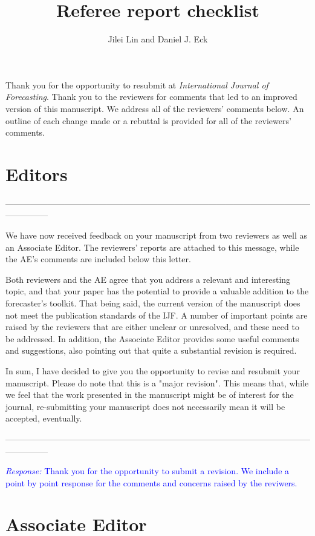 \documentclass[12pt]{article}
\title{Referee report checklist}
\author{Jilei Lin and Daniel J. Eck}
\date{}
\newcommand{\response}[1]{\noindent \textcolor{blue}{\emph{Response:} #1}}
\begin{document}
\maketitle

Thank you for the opportunity to resubmit at \emph{International Journal of Forecasting}. Thank you to the reviewers for comments that led to an improved version of this manuscript. We address all of the reviewers' comments below. An outline of each change made or a rebuttal is provided for all of the reviewers' comments.

\section*{Editors}

---------------------------------------------------------------------------------------------------------------------------


We have now received feedback on your manuscript from two reviewers as well as an Associate Editor. The reviewers' reports are attached to this message, while the AE's comments are included below this letter.

Both reviewers and the AE agree that you address a relevant and interesting topic, and that your paper has the potential to provide a valuable addition to the forecaster's toolkit. That being said, the current version of the manuscript does not meet the publication standards of the IJF. A number of important points are raised by the reviewers that are either unclear or unresolved, and these need to be addressed. In addition, the Associate Editor provides some useful comments and suggestions, also pointing out that quite a substantial revision is required.

In sum, I have decided to give you the opportunity to revise and resubmit your manuscript. Please do note that this is a "major revision". This means that, while we feel that the work presented in the manuscript might be of interest for the journal, re-submitting your manuscript does not necessarily mean it will be accepted, eventually.

---------------------------------------------------------------------------------------------------------------------------

\response{Thank you for the opportunity to submit a revision. We include a point by point response for the comments and concerns raised by the reviwers.}

\section*{Associate Editor}
\end{document}

